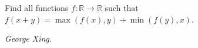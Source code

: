 Find all functions $f: \mathbb{R} \to \mathbb{R}$ such that $f(x+y) = \max(f(x),y) + \min(f(y),x)$.

\textit{George Xing.}